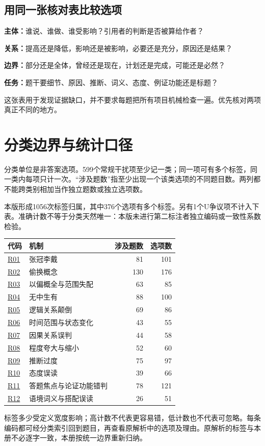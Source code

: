 \documentclass[11pt,a4paper]{article}
\begin{document}
\subsection{用同一张核对表比较选项}
\noindent\textbf{主体：}谁说、谁做、谁受影响？引用者的判断是否被算给作者？\par
\noindent\textbf{关系：}提高还是降低，影响还是被影响，必要还是充分，原因还是结果？\par
\noindent\textbf{边界：}部分还是全体，曾经还是现在，计划还是完成，可能还是必然？\par
\noindent\textbf{任务：}题干要细节、原因、推断、词义、态度、例证功能还是标题？\par
这张表用于发现证据缺口，并不要求每题把所有项目机械检查一遍。优先核对两项真正不同的地方。\par
\clearpage\section{分类边界与统计口径}\label{taxonomy}
分类单位是非答案选项。599个常规干扰项至少记一类；同一项可有多个标签，同一类内每项只计一次。“涉及题数”指至少出现一个该类选项的不同题目数。两列都不能跨类别相加当作独立题数或独立选项数。\par
本版形成1056次标签归属，其中376个选项有多个标签。另有1个U争议项不计入下表。准确计数不等于分类天然唯一：本版未进行第二标注者独立编码或一致性系数检验。\par
\begin{longtable}{@{}p{1.1cm}p{8.6cm}rr@{}}\toprule 代码 & 机制 & 涉及题数 & 选项数\\\midrule\endhead
\hyperref[cat-R01]{R01} & 张冠李戴 & 81 & 101\\
\hyperref[cat-R02]{R02} & 偷换概念 & 130 & 176\\
\hyperref[cat-R03]{R03} & 以偏概全与范围失配 & 63 & 85\\
\hyperref[cat-R04]{R04} & 无中生有 & 88 & 100\\
\hyperref[cat-R05]{R05} & 逻辑关系颠倒 & 69 & 86\\
\hyperref[cat-R06]{R06} & 时间范围与状态变化 & 43 & 55\\
\hyperref[cat-R07]{R07} & 因果关系误判 & 44 & 58\\
\hyperref[cat-R08]{R08} & 程度夸大与缩小 & 52 & 60\\
\hyperref[cat-R09]{R09} & 推断过度 & 75 & 97\\
\hyperref[cat-R10]{R10} & 态度误读 & 39 & 66\\
\hyperref[cat-R11]{R11} & 答题焦点与论证功能错判 & 78 & 121\\
\hyperref[cat-R12]{R12} & 语境词义与搭配误读 & 26 & 51\\
\bottomrule\end{longtable}
标签多少受定义宽度影响；高计数不代表更容易错，低计数也不代表可忽略。每条编码都可经分类索引回到题目，再查看原解析中的选项及理由。原解析的标签与本册不必逐字一致，本册按统一边界重新归纳。\par
{}
\end{document}
